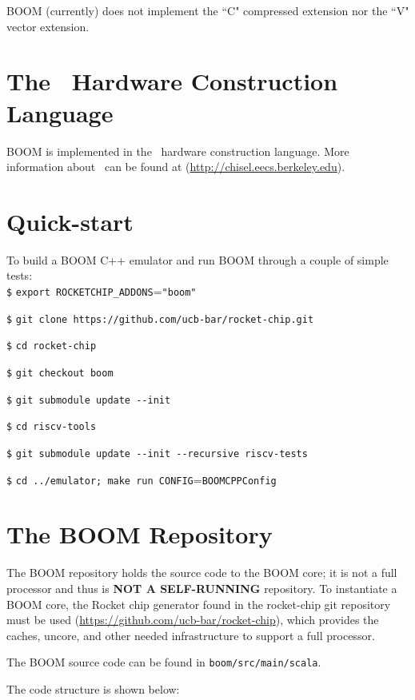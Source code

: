 BOOM (currently) does not implement the ``C" compressed extension nor the ``V" vector extension.

\section{The \Chisel\ Hardware Construction Language}

BOOM is implemented in the \Chisel\ hardware construction language.  More information about \Chisel\ can be found at (\url{http://chisel.eecs.berkeley.edu}). 

\section{Quick-start}


To build a BOOM C++ emulator and run BOOM through a couple of simple tests:
\\

\texttt{\$} \verb=export ROCKETCHIP_ADDONS==\verb="boom"=

\texttt{\$} \verb=git clone https://github.com/ucb-bar/rocket-chip.git=

\texttt{\$} \verb=cd rocket-chip=

\texttt{\$} \verb=git checkout boom=

\texttt{\$} \verb=git submodule update --init=

\texttt{\$} \verb=cd riscv-tools=

\texttt{\$} \verb=git submodule update --init --recursive riscv-tests=

\texttt{\$} \verb=cd ../emulator; make run CONFIG==\verb=BOOMCPPConfig=


\section{The BOOM Repository}

The BOOM repository holds the source code to the BOOM core; it is not a full processor and thus is \textbf{NOT A SELF-RUNNING} repository.  To instantiate a BOOM core, the Rocket chip generator found in the rocket-chip git repository must be used (\url{https://github.com/ucb-bar/rocket-chip}), which provides the caches, uncore, and other needed infrastructure to support a full processor.

The BOOM source code can be found in \verb=boom/src/main/scala=.  

The code structure is shown below:


